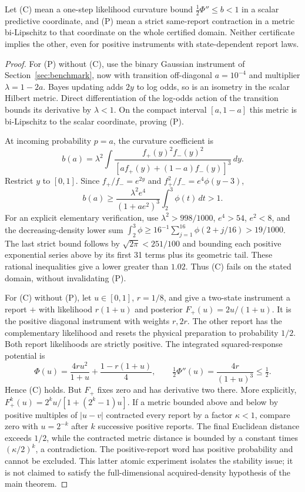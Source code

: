 \begin{proposition}\label{prop:stability}
Let (C) mean a one-step likelihood curvature bound $\tfrac12\Phi''\le b<1$ in a scalar predictive coordinate, and (P) mean a strict same-report contraction in a metric bi-Lipschitz to that coordinate on the whole certified domain. Neither certificate implies the other, even for positive instruments with state-dependent report laws.
\end{proposition}
\begin{proof}
For (P) without (C), use the binary Gaussian instrument of Section~\ref{sec:benchmark}, now with transition off-diagonal $a=10^{-4}$ and multiplier $\lambda=1-2a$. Bayes updating adds $2y$ to log odds, so is an isometry in the scalar Hilbert metric. Direct differentiation of the log-odds action of the transition bounds its derivative by $\lambda<1$. On the compact interval $[a,1-a]$ this metric is bi-Lipschitz to the scalar coordinate, proving (P).

At incoming probability $p=a$, the curvature coefficient is
\[
 b(a)=\lambda^2\int\frac{f_+(y)^2f_-(y)^2}{[a f_+(y)+(1-a)f_-(y)]^3}\,dy.
\]
Restrict $y$ to $[0,1]$. Since $f_+/f_-=e^{2y}$ and $f_+^2/f_-=e^4\phi(y-3)$,
\[
 b(a)\ge\frac{\lambda^2e^4}{(1+ae^2)^3}\int_2^3\phi(t)\,dt>1.
\]
For an explicit elementary verification, use $\lambda^2>998/1000$, $e^4>54$, $e^2<8$, and the decreasing-density lower sum
$\int_2^3\phi\ge16^{-1}\sum_{j=1}^{16}\phi(2+j/16)>19/1000$.
The last strict bound follows by $\sqrt{2\pi}<251/100$ and bounding each positive exponential series above by its first 31 terms plus its geometric tail. These rational inequalities give a lower greater than $1.02$. Thus (C) fails on the stated domain, without invalidating (P).

For (C) without (P), let $u\in[0,1]$, $r=1/8$, and give a two-state instrument a report $+$ with likelihood $r(1+u)$ and posterior $F_+(u)=2u/(1+u)$. It is the positive diagonal instrument with weights $r,2r$. The other report has the complementary likelihood and resets the physical preparation to probability $1/2$. Both report likelihoods are strictly positive. The integrated squared-response potential is
\[
 \Phi(u)=\frac{4ru^2}{1+u}+\frac{1-r(1+u)}4,
 \qquad \tfrac12\Phi''(u)=\frac{4r}{(1+u)^3}\le\tfrac12.
\]
Hence (C) holds. But $F_+$ fixes zero and has derivative two there. More explicitly,
$F_+^k(u)=2^ku/[1+(2^k-1)u]$.
If a metric bounded above and below by positive multiples of $|u-v|$ contracted every report by a factor $\kappa<1$, compare zero with $u=2^{-k}$ after $k$ successive positive reports. The final Euclidean distance exceeds $1/2$, while the contracted metric distance is bounded by a constant times $(\kappa/2)^k$, a contradiction. The positive-report word has positive probability and cannot be excluded. This latter atomic experiment isolates the stability issue; it is not claimed to satisfy the full-dimensional acquired-density hypothesis of the main theorem.
\end{proof}
